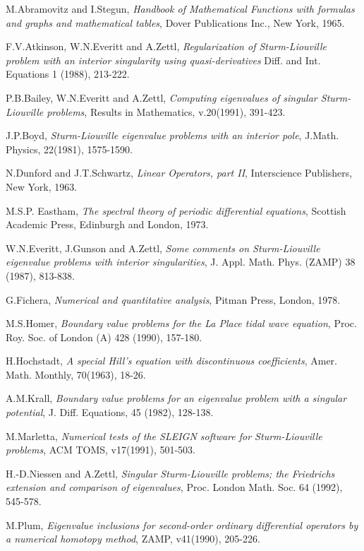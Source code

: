 \begin{thebibliography}{999}

 M.Abramovitz and I.Stegun, {\em Handbook of Mathematical Functions 
with formulas and graphs and mathematical tables}, Dover Publications Inc., 
New York, 1965.

 F.V.Atkinson, W.N.Everitt and A.Zettl, {\em Regularization of 
Sturm-Liouville problem with an interior singularity using quasi-derivatives}
 Diff. and Int. Equations 1 (1988), 213-222.

 P.B.Bailey, W.N.Everitt and A.Zettl, {\em Computing eigenvalues 
of singular Sturm-Liouville problems}, Results in Mathematics, v.20(1991), 
391-423.

 J.P.Boyd, {\em Sturm-Liouville eigenvalue problems with 
an interior pole}, J.Math. Physics, 22(1981), 1575-1590.

 N.Dunford and J.T.Schwartz, {\em Linear Operators, part II}, 
Interscience Publishers, New York, 1963.

 M.S.P. Eastham, {\em The spectral theory of periodic differential 
equations}, Scottish Academic Press, Edinburgh and London, 1973.

 W.N.Everitt, J.Gunson and A.Zettl, {\em Some comments on  
Sturm-Liouville eigenvalue problems with interior singularities}, J.
Appl. Math. Phys. (ZAMP) 38 (1987), 813-838.

 G.Fichera, {\em Numerical and quantitative analysis}, 
Pitman Press, London, 1978.

 M.S.Homer, {\em Boundary value problems for the La Place tidal wave  
equation}, Proc. Roy. Soc. of London (A) 428 (1990), 157-180.

 H.Hochstadt, {\em A special Hill's equation with discontinuous 
coefficients}, Amer. Math. Monthly, 70(1963), 18-26.

 A.M.Krall, {\em Boundary value problems for an eigenvalue problem 
with a singular potential}, J. Diff. Equations, 45 (1982), 128-138.

 M.Marletta, {\em Numerical tests of the SLEIGN software for 
Sturm-Liouville problems}, ACM TOMS, v17(1991), 501-503.

 H.-D.Niessen and A.Zettl, {\em Singular Sturm-Liouville problems;
the Friedrichs extension and comparison of eigenvalues}, Proc. London
Math. Soc. 64 (1992), 545-578.

 M.Plum, {\em Eigenvalue inclusions for second-order ordinary 
differential operators by a numerical homotopy method}, ZAMP, v41(1990),
205-226.


\end{thebibliography}

